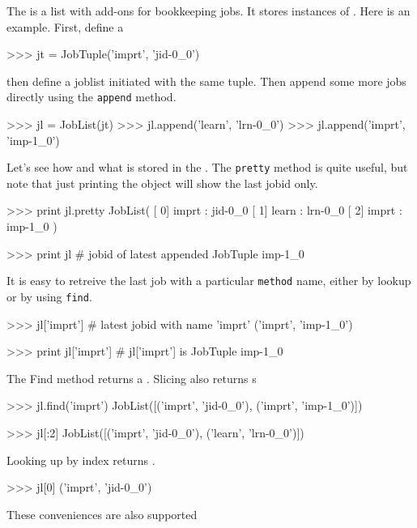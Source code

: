 \label{sec:joblist}
The \joblist is a list with add-ons for bookkeeping jobs.  It stores
instances of \jobtuple.  Here is an example.  First, define a \jobtuple

\begin{python}
>>> jt = JobTuple('imprt', 'jid-0_0')
\end{python}

\noindent then define a joblist initiated with the same tuple.  Then
append some more jobs directly using the \texttt{append} method.

\begin{python}
>>> jl = JobList(jt)
>>> jl.append('learn', 'lrn-0_0')
>>> jl.append('imprt', 'imp-1_0')
\end{python}

\noindent Let's see how and what is stored in the \joblist.  The
\texttt{pretty} method is quite useful, but note that just printing
the object will show the last jobid only.

\begin{python}
>>> print jl.pretty
JobList(
   [  0]  imprt : jid-0_0
   [  1]  learn : lrn-0_0
   [  2]  imprt : imp-1_0
)

>>>  print jl  # jobid of latest appended JobTuple
imp-1_0
\end{python}

\noindent It is easy to retreive the last job with a particular \texttt{method} name,
either by lookup or by using \texttt{find}.

\begin{python}
>>> jl['imprt']         # latest jobid with name 'imprt'
('imprt', 'imp-1_0')

>>> print jl['imprt']   # jl['imprt'] is JobTuple
imp-1_0
\end{python}

\noindent The Find method returns a \joblist.  Slicing also returns {\joblist}s

\begin{python}
>>> jl.find('imprt')
JobList([('imprt', 'jid-0_0'), ('imprt', 'imp-1_0')])

>>> jl[:2]
JobList([('imprt', 'jid-0_0'), ('learn', 'lrn-0_0')])
\end{python}

\noindent Looking up by index returns \jobtuple.

\begin{python}
>>> jl[0]
('imprt', 'jid-0_0')
\end{python}

\noindent These conveniences are also supported

